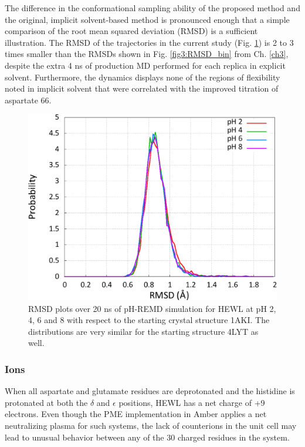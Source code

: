The difference in the conformational sampling ability of the proposed method and
the original, implicit solvent-based method is pronounced enough that a simple
comparison of the root mean squared deviation (RMSD) is a sufficient
illustration. The RMSD of the trajectories in the current study (Fig.
\ref{fig4:hewl_rmsd}) is 2 to 3 times smaller than the RMSDs shown in Fig.
\ref{fig3:RMSD_bin} from Ch. \ref{ch3}, despite the extra 4 ns of production MD
performed for each replica in explicit solvent. Furthermore, the dynamics
displays none of the regions of flexibility noted in implicit solvent that were
correlated with the improved titration of aspartate 66.
\cite{Swails_JChemTheoryComput_2012_v8_p4393}

\begin{figure}
   \includegraphics[width=6.5in]{1AKI_RMSDs.eps}
   \caption{RMSD plots over 20 ns of pH-REMD simulation for HEWL at pH 2, 4, 6
            and 8 with respect to the starting crystal structure 1AKI. The
            distributions are very similar for the starting structure 4LYT as
            well.}
   \label{fig4:hewl_rmsd}
\end{figure}

\subsubsection*{Ions}

When all aspartate and glutamate residues are deprotonated and the histidine is
protonated at both the $\delta$ and $\epsilon$ positions, HEWL has a net charge
of +9 electrons. Even though the PME implementation in Amber applies a net
neutralizing plasma for such systems, the lack of counterions in the unit cell
may lead to unusual behavior between any of the 30 charged residues in the
system.

